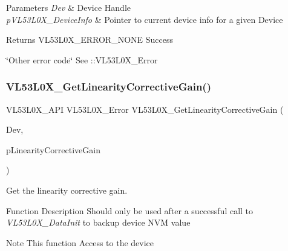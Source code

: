\begin{DoxyParams}{Parameters}
{\em Dev} & Device Handle \\
\hline
{\em p\+V\+L53\+L0\+X\+\_\+\+Device\+Info} & Pointer to current device info for a given Device \\
\hline
\end{DoxyParams}
\begin{DoxyReturn}{Returns}
V\+L53\+L0\+X\+\_\+\+E\+R\+R\+O\+R\+\_\+\+N\+O\+NE Success 

\char`\"{}\+Other error code\char`\"{} See \+::\+V\+L53\+L0\+X\+\_\+\+Error 
\end{DoxyReturn}
\mbox{\label{group__VL53L0X__general__group_ga921717fe0182527ce358b9c5ded340f1}} 
\subsubsection{\texorpdfstring{V\+L53\+L0\+X\+\_\+\+Get\+Linearity\+Corrective\+Gain()}{VL53L0X\_GetLinearityCorrectiveGain()}}
{\footnotesize\ttfamily V\+L53\+L0\+X\+\_\+\+A\+PI V\+L53\+L0\+X\+\_\+\+Error V\+L53\+L0\+X\+\_\+\+Get\+Linearity\+Corrective\+Gain (\begin{DoxyParamCaption}\item[{\hyperlink{group__VL53L0X__platform__group_ga2d6405308b1dd524b462f1b8fb97d167}{V\+L53\+L0\+X\+\_\+\+D\+EV}}]{Dev,  }\item[{\hyperlink{vl53l0x__types_8h_a273cf69d639a59973b6019625df33e30}{uint16\+\_\+t} $\ast$}]{p\+Linearity\+Corrective\+Gain }\end{DoxyParamCaption})}



Get the linearity corrective gain. 

\begin{DoxyParagraph}{Function Description}
Should only be used after a successful call to {\itshape V\+L53\+L0\+X\+\_\+\+Data\+Init} to backup device N\+VM value
\end{DoxyParagraph}
\begin{DoxyNote}{Note}
This function Access to the device
\end{DoxyNote}

